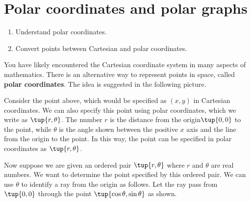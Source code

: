 \section{Polar coordinates and polar graphs}

\begin{outcome}
  \begin{enumerate}
  \item Understand polar coordinates.
  \item Convert points between Cartesian and polar coordinates.
  \end{enumerate}
\end{outcome}

You have likely encountered the Cartesian coordinate system in many aspects of mathematics. There is an alternative way to represent points in space, called \textbf{polar
coordinates}. The idea is suggested in the following picture.

\begin{center}
\end{center}

Consider the point above, which would be specified as $(x,y)$ in Cartesian coordinates. We can also specify this point using polar coordinates, which we write as $\tup{r, \theta }$. The number $r$ is the distance from the origin$\tup{0,0}$ to the point, while $\theta $ is the angle shown
between the positive $x$ axis and the line from the origin to the point. In this way, the point can be specified in polar coordinates as $\tup{r, \theta }$.

Now suppose we are given an ordered pair $\tup{r,\theta } $ where 
$r$ and $\theta$ are real numbers. We want to determine the point specified by this ordered pair. We can use $\theta $ to identify a ray
from the origin as follows. Let the ray pass from $\tup{0,0} $
through the point $\tup{\cos \theta ,\sin \theta } $ as shown.

\begin{center}
\end{center}

